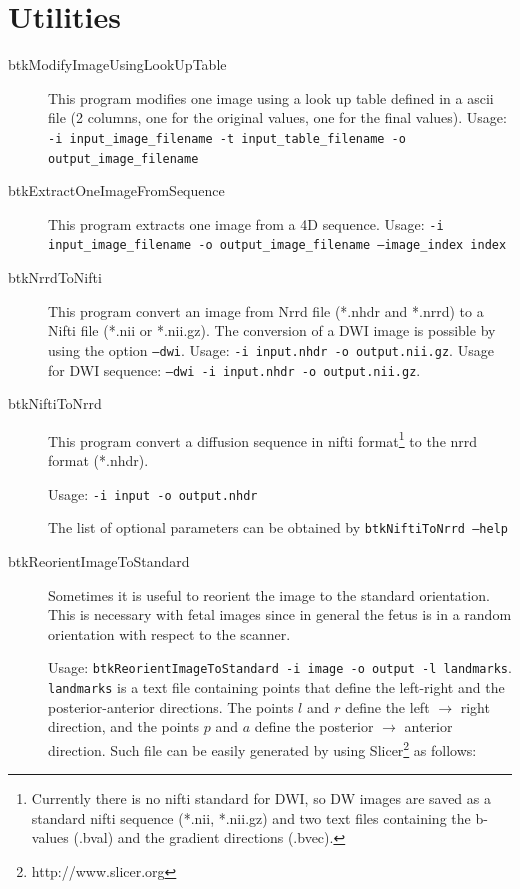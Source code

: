 \section{Utilities}
\label{sec:utilities}

\begin{description}

\item[btkModifyImageUsingLookUpTable] This program modifies one image using a
look up table defined in a ascii file (2 columns, one for the original values,
one for the final values). Usage: \texttt{-i input\_image\_filename -t
input\_table\_filename -o output\_image\_filename}
  
\item[btkExtractOneImageFromSequence] This program extracts one image from a 4D sequence. Usage: \texttt{-i input\_image\_filename -o output\_image\_filename --image\_index index}

\item[btkNrrdToNifti] This program convert an image from Nrrd file (*.nhdr and *.nrrd) to a Nifti file (*.nii or *.nii.gz). The conversion of a DWI image is possible by using the option \texttt{--dwi}. Usage: \texttt{-i input.nhdr -o output.nii.gz}. Usage for DWI sequence: \texttt{--dwi -i input.nhdr -o output.nii.gz}.

\item[btkNiftiToNrrd] This program convert a diffusion sequence in nifti
format\footnote{Currently there is no nifti standard for DWI, so DW images are
saved as a standard nifti sequence (*.nii, *.nii.gz) and two text files
containing the b-values (.bval) and the gradient directions (.bvec).}  to the
nrrd format (*.nhdr). 

Usage: \texttt{-i input -o output.nhdr}

The list of optional parameters can be obtained by \texttt{btkNiftiToNrrd
--help}

\item[btkReorientImageToStandard] Sometimes it is useful
to reorient the image to the standard orientation. This is necessary with fetal
images since in general the fetus is in a random orientation with respect to the
scanner.

Usage: \texttt{btkReorientImageToStandard -i image -o output -l landmarks}.
\texttt{landmarks} is a text file containing points that define the left-right
and the posterior-anterior directions. The points $l$ and $r$ define the left
$\rightarrow$ right direction, and the points $p$ and $a$ define the posterior
$\rightarrow$ anterior direction. Such file can be easily generated by using
Slicer\footnote{http://www.slicer.org} as follows:


\end{description}
